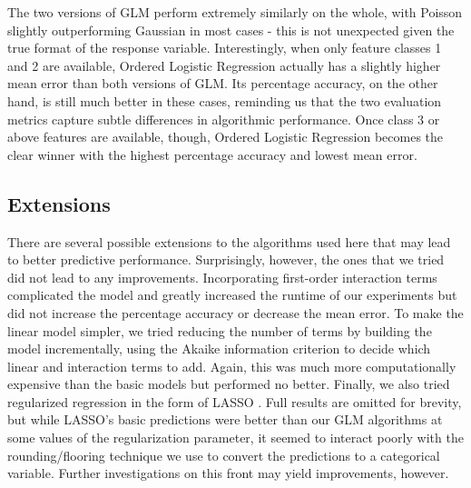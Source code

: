 The two versions of GLM perform extremely similarly on the whole, with Poisson slightly outperforming Gaussian in most cases - this is not unexpected given the true format of the response variable.  Interestingly, when only feature classes 1 and 2 are available, Ordered Logistic Regression actually has a slightly higher mean error than both versions of GLM.  Its percentage accuracy, on the other hand, is still much better in these cases, reminding us that the two evaluation metrics capture subtle differences in algorithmic performance.  Once class 3 or above features are available, though, Ordered Logistic Regression becomes the clear winner with the highest percentage accuracy and lowest mean error.

\subsection{Extensions}

There are several possible extensions to the algorithms used here that may lead to better predictive performance.  Surprisingly, however, the ones that we tried did not lead to any improvements.  Incorporating first-order interaction terms complicated the model and greatly increased the runtime of our experiments but did not increase the percentage accuracy or decrease the mean error.  To make the linear model simpler, we tried reducing the number of terms by building the model incrementally, using the Akaike information criterion \cite{AIC} to decide which linear and interaction terms to add.  Again, this was much more computationally expensive than the basic models but performed no better.  Finally, we also tried regularized regression in the form of LASSO \cite{LASSO}.  Full results are omitted for brevity, but while LASSO's basic predictions were better than our GLM algorithms at some values of the regularization parameter, it seemed to interact poorly with the rounding/flooring technique we use to convert the predictions to a categorical variable.  Further investigations on this front may yield improvements, however.
